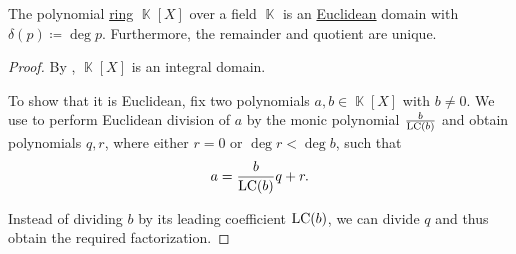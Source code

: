 \begin{corollary}\label{thm:polynomials_over_field_are_euclidean_domain}
  The polynomial \hyperref[def:semiring/integral_domain]{ring} \( \BbbK[X] \) over a field \( \BbbK \) is an \hyperref[def:semiring/euclidean_domain]{Euclidean} domain with \( \delta(p) \coloneqq \deg p \). Furthermore, the remainder and quotient are unique.
\end{corollary}
\begin{proof}
  By , \( \BbbK[X] \) is an integral domain.

  To show that it is Euclidean, fix two polynomials \( a, b \in \BbbK[X] \) with \( b \neq 0 \). We use  to perform Euclidean division of \( a \) by the monic polynomial \( \frac {b} {\operatorname{LC}(b)} \) and obtain polynomials \( q, r \), where either \( r = 0 \) or \( \deg r < \deg b \), such that
  \begin{equation*}
    a = \frac {b} {\operatorname{LC}(b)} q + r.
  \end{equation*}

  Instead of dividing \( b \) by its leading coefficient \( \operatorname{LC}(b) \), we can divide \( q \) and thus obtain the required factorization.
\end{proof}

